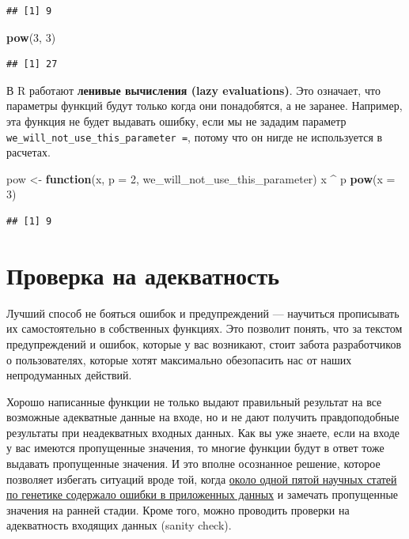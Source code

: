 \documentclass[]{book}
\newenvironment{Shaded}{\begin{snugshade}}{\end{snugshade}}
\newcommand{\KeywordTok}[1]{\textcolor[rgb]{0.13,0.29,0.53}{\textbf{#1}}}
\newcommand{\DataTypeTok}[1]{\textcolor[rgb]{0.13,0.29,0.53}{#1}}
\newcommand{\DecValTok}[1]{\textcolor[rgb]{0.00,0.00,0.81}{#1}}
\newcommand{\StringTok}[1]{\textcolor[rgb]{0.31,0.60,0.02}{#1}}
\newcommand{\ControlFlowTok}[1]{\textcolor[rgb]{0.13,0.29,0.53}{\textbf{#1}}}
\newcommand{\OperatorTok}[1]{\textcolor[rgb]{0.81,0.36,0.00}{\textbf{#1}}}
\newcommand{\NormalTok}[1]{#1}
\begin{document}
\begin{verbatim}
## [1] 9
\end{verbatim}

\begin{Shaded}
\begin{Highlighting}[]
\KeywordTok{pow}\NormalTok{(}\DecValTok{3}\NormalTok{, }\DecValTok{3}\NormalTok{) }
\end{Highlighting}
\end{Shaded}

\begin{verbatim}
## [1] 27
\end{verbatim}

В R работают \textbf{ленивые вычисления (lazy evaluations)}. Это
означает, что параметры функций будут только когда они понадобятся, а не
заранее. Например, эта функция не будет выдавать ошибку, если мы не
зададим параметр \texttt{we\_will\_not\_use\_this\_parameter\ =}, потому
что он нигде не используется в расчетах.

\begin{Shaded}
\begin{Highlighting}[]
\NormalTok{pow <-}\StringTok{ }\ControlFlowTok{function}\NormalTok{(x, }\DataTypeTok{p =} \DecValTok{2}\NormalTok{, we_will_not_use_this_parameter) x }\OperatorTok{^}\StringTok{ }\NormalTok{p}
\KeywordTok{pow}\NormalTok{(}\DataTypeTok{x =} \DecValTok{3}\NormalTok{)}
\end{Highlighting}
\end{Shaded}

\begin{verbatim}
## [1] 9
\end{verbatim}

\section{Проверка на адекватность}\label{sanity_check}

Лучший способ не бояться ошибок и предупреждений --- научиться
прописывать их самостоятельно в собственных функциях. Это позволит
понять, что за текстом предупреждений и ошибок, которые у вас возникают,
стоит забота разработчиков о пользователях, которые хотят максимально
обезопасить нас от наших непродуманных действий.

Хорошо написанные функции не только выдают правильный результат на все
возможные адекватные данные на входе, но и не дают получить
правдоподобные результаты при неадекватных входных данных. Как вы уже
знаете, если на входе у вас имеются пропущенные значения, то многие
функции будут в ответ тоже выдавать пропущенные значения. И это вполне
осознанное решение, которое позволяет избегать ситуаций вроде той, когда
\href{https://genomebiology.biomedcentral.com/articles/10.1186/s13059-016-1044-7}{около
одной пятой научных статей по генетике содержало ошибки в приложенных
данных} и замечать пропущенные значения на ранней стадии. Кроме того,
можно проводить проверки на адекватность входящих данных (sanity check).
\end{document}
